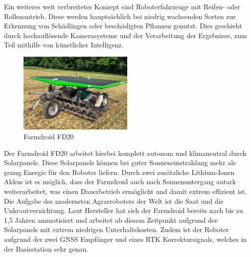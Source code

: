 Ein weiteres weit verbreitetes Konzept sind Roboterfahrzeuge mit Reifen- oder
Rollenantrieb. Diese werden hauptsächlich bei niedrig wachsenden Sorten zur
Erkennung von Schädlingen oder beschädigten Pflanzen genutzt. Dies geschieht
durch hochauflösende Kamerasysteme und der Verarbeitung der Ergebnisse, zum
Teil mithilfe von künstlicher Intelligenz.

\begin{figure}[h]
	\centering
	\includegraphics[width=0.5\textwidth]{bilder/farmdroid_fd20.png}
	\caption[Farmdroid FD20]{Farmdroid FD20}
	\label{fig:farmdroid_fd20}
\end{figure}

Der Farmdroid FD20 arbeitet hierbei komplett autonom und klimaneutral durch
Solarpanels. Diese Solarpanels können bei guter Sonneneinstrahlung mehr als
genug Energie für den Roboter liefern. Durch zwei zusätzliche Lithium-Ionen
Akkus ist es möglich, dass der Farmdroid auch nach Sonnenuntergang autark
weiterarbeitet, was einen Dauerbetrieb ermöglicht und damit extrem effizient
ist.\cite{jungwirth2022arbeitszeitbedarf}\\ Die Aufgabe des modernsten
Agrarroboters der Welt\cite{donaukurier2022} ist die Saat und die
Unkrautvernichtung. Laut Hersteller hat sich der Farmdroid bereits nach bis zu
1,5 Jahren ammotisiert und arbeitet ab diesem Zeitpunkt aufgrund der
Solarpanels mit extrem niedrigen Unterhaltskosten. Zudem ist der Roboter
aufgrund der zwei GNSS Empfänger und eines RTK Korrektursignals, welches in der
Basisstation sehr genau.\cite{jungwirth2022arbeitszeitbedarf}